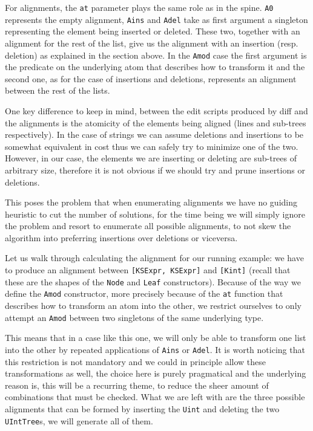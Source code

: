 \documentclass[11pt, titlepage]{article}
\newcommand{\toHaskell}[1]{\texttt{#1}\xspace}
\begin{document}
For alignments, the \toHaskell{at} parameter plays the same role as in the spine. 
\texttt{A0} represents the empty alignment, \texttt{Ains} and \texttt{Adel} take as first argument
a singleton representing the element being inserted or deleted. These two, together
with an alignment for the rest of the list, give us the alignment with
an insertion (resp. deletion) as explained in the section above. In the
\texttt{Amod} case the first argument is the predicate on the underlying atom that describes how to transform 
it and the second one, as for the case of insertions and deletions, represents an  
alignment between the rest of the lists. 

One key difference to keep in mind, between the edit scripts produced by diff and the alignments is the atomicity of the elements being aligned (lines and sub-trees respectively). In the
case of strings we can assume deletions and insertions to be somewhat
equivalent in cost thus we can safely try to minimize one of the two.
However, in our case, the elements we are inserting or deleting are
sub-trees of arbitrary size, therefore it is not obvious if we should try and prune
insertions or deletions.

This poses the problem that when enumerating alignments we have no guiding heuristic to cut the number of solutions, for the time being we will simply ignore the problem and resort to enumerate
all possible alignments, to not skew the algorithm into preferring
insertions over deletions or viceversa.

Let us walk through calculating the alignment for our running example: we have to 
produce an alignment between \texttt{[KSExpr, KSExpr]} and \texttt{[Kint]} (recall that these are the shapes of the 
\texttt{Node} and \texttt{Leaf} constructors). Because of the way we 
define the \texttt{Amod} constructor, more precisely because of the \texttt{at} 
function that describes how to transform an atom into the other, we restrict 
ourselves to only attempt an \texttt{Amod} between two singletons of the same underlying type. 

This means that in a case like this one, we will only be able to transform 
one list into the other by repeated applications of \texttt{Ains} or 
\texttt{Adel}. It is worth noticing that this restriction is not mandatory and 
we could in principle allow these transformations as well, the choice here is purely pragmatical and the underlying reason is,
this will be a recurring theme, to reduce the sheer amount of combinations that must be checked.
What we are left with are the three possible alignments that can be formed by inserting the \texttt{Uint} and deleting the two \texttt{UIntTree}s, we will generate all of them. 
\end{document}
